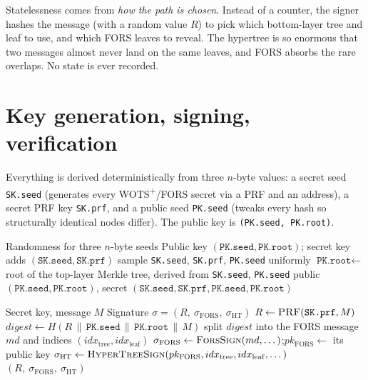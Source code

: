 Statelessness comes from \emph{how the path is chosen}. Instead of a counter, the signer hashes the message (with a random value $R$) to pick which bottom-layer tree and leaf to use, and which FORS leaves to reveal. The hypertree is so enormous that two messages almost never land on the same leaves, and FORS absorbs the rare overlaps. No state is ever recorded.

\section{Key generation, signing, verification}

Everything is derived deterministically from three $n$-byte values: a secret seed \texttt{SK.seed} (generates every WOTS\textsuperscript{+}/FORS secret via a PRF and an address), a secret PRF key \texttt{SK.prf}, and a public seed \texttt{PK.seed} (tweaks every hash so structurally identical nodes differ). The public key is \texttt{(PK.seed, PK.root)}.

\begin{algorithm}[H]
\caption{SLH-DSA.KeyGen (teaching form)}
\label{alg:slhdsa-keygen}
\begin{algorithmic}[1]
\Require Randomness for three $n$-byte seeds
\Ensure Public key $(\texttt{PK.seed},\texttt{PK.root})$; secret key adds $(\texttt{SK.seed},\texttt{SK.prf})$
\State sample \texttt{SK.seed}, \texttt{SK.prf}, \texttt{PK.seed} uniformly
\State $\texttt{PK.root} \gets$ root of the top-layer Merkle tree, derived from \texttt{SK.seed}, \texttt{PK.seed}
\State \Return public $(\texttt{PK.seed},\texttt{PK.root})$, secret $(\texttt{SK.seed},\texttt{SK.prf},\texttt{PK.seed},\texttt{PK.root})$
\end{algorithmic}
\end{algorithm}

\begin{algorithm}[H]
\caption{SLH-DSA.Sign (teaching form)}
\label{alg:slhdsa-sign}
\begin{algorithmic}[1]
\Require Secret key, message $M$
\Ensure Signature $\sigma = (R,\ \sigma_{\mathrm{FORS}},\ \sigma_{\mathrm{HT}})$
\State $R \gets \textsc{PRF}(\texttt{SK.prf}, M)$ 
\State $digest \gets H(R \,\|\, \texttt{PK.seed} \,\|\, \texttt{PK.root} \,\|\, M)$
\State split $digest$ into the FORS message $md$ and indices $(idx_{\mathrm{tree}}, idx_{\mathrm{leaf}})$
\State $\sigma_{\mathrm{FORS}} \gets \textsc{ForsSign}(md, \dots)$;\quad $pk_{\mathrm{FORS}} \gets$ its public key
\State $\sigma_{\mathrm{HT}} \gets \textsc{HyperTreeSign}(pk_{\mathrm{FORS}}, idx_{\mathrm{tree}}, idx_{\mathrm{leaf}}, \dots)$
\State \Return $(R,\ \sigma_{\mathrm{FORS}},\ \sigma_{\mathrm{HT}})$
\end{algorithmic}
\end{algorithm}

